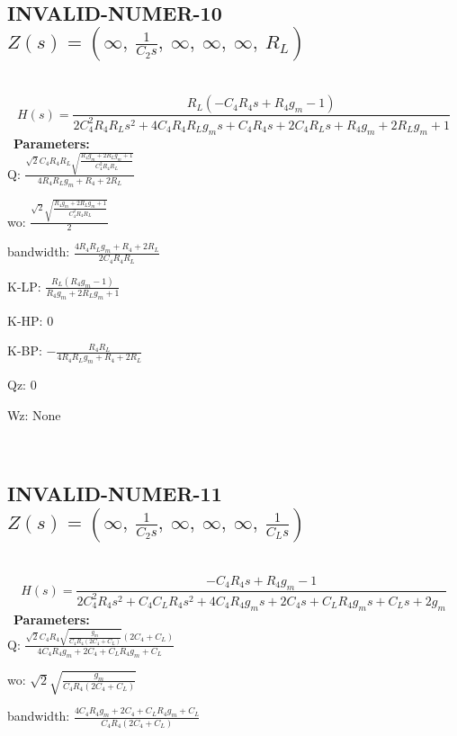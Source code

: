 \documentclass{article}
\begin{document}
\ 

\subsection{INVALID-NUMER-10 $Z(s) = \left( \infty, \  \frac{1}{C_{2} s}, \  \infty, \  \infty, \  \infty, \  R_{L}\right)$ } \ 
\textbf{\[H(s) = \frac{R_{L} \left(- C_{4} R_{4} s + R_{4} g_{m} - 1\right)}{2 C_{4}^{2} R_{4} R_{L} s^{2} + 4 C_{4} R_{4} R_{L} g_{m} s + C_{4} R_{4} s + 2 C_{4} R_{L} s + R_{4} g_{m} + 2 R_{L} g_{m} + 1}\] } \ 
\textbf{Parameters:}\\ 

Q: $\frac{\sqrt{2} C_{4} R_{4} R_{L} \sqrt{\frac{R_{4} g_{m} + 2 R_{L} g_{m} + 1}{C_{4}^{2} R_{4} R_{L}}}}{4 R_{4} R_{L} g_{m} + R_{4} + 2 R_{L}}$\ 

wo: $\frac{\sqrt{2} \sqrt{\frac{R_{4} g_{m} + 2 R_{L} g_{m} + 1}{C_{4}^{2} R_{4} R_{L}}}}{2}$\ 

bandwidth: $\frac{4 R_{4} R_{L} g_{m} + R_{4} + 2 R_{L}}{2 C_{4} R_{4} R_{L}}$\ 

K-LP: $\frac{R_{L} \left(R_{4} g_{m} - 1\right)}{R_{4} g_{m} + 2 R_{L} g_{m} + 1}$\ 

K-HP: $0$\ 

K-BP: $- \frac{R_{4} R_{L}}{4 R_{4} R_{L} g_{m} + R_{4} + 2 R_{L}}$\ 

Qz: $0$\ 

Wz: $\text{None}$\ 

\ 

\subsection{INVALID-NUMER-11 $Z(s) = \left( \infty, \  \frac{1}{C_{2} s}, \  \infty, \  \infty, \  \infty, \  \frac{1}{C_{L} s}\right)$ } \ 
\textbf{\[H(s) = \frac{- C_{4} R_{4} s + R_{4} g_{m} - 1}{2 C_{4}^{2} R_{4} s^{2} + C_{4} C_{L} R_{4} s^{2} + 4 C_{4} R_{4} g_{m} s + 2 C_{4} s + C_{L} R_{4} g_{m} s + C_{L} s + 2 g_{m}}\] } \ 
\textbf{Parameters:}\\ 

Q: $\frac{\sqrt{2} C_{4} R_{4} \sqrt{\frac{g_{m}}{C_{4} R_{4} \left(2 C_{4} + C_{L}\right)}} \left(2 C_{4} + C_{L}\right)}{4 C_{4} R_{4} g_{m} + 2 C_{4} + C_{L} R_{4} g_{m} + C_{L}}$\ 

wo: $\sqrt{2} \sqrt{\frac{g_{m}}{C_{4} R_{4} \left(2 C_{4} + C_{L}\right)}}$\ 

bandwidth: $\frac{4 C_{4} R_{4} g_{m} + 2 C_{4} + C_{L} R_{4} g_{m} + C_{L}}{C_{4} R_{4} \left(2 C_{4} + C_{L}\right)}$\ 
\end{document}
